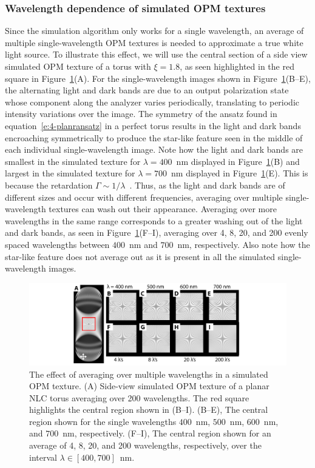 \subsubsection{Wavelength dependence of simulated OPM textures}
Since the simulation algorithm only works for a single wavelength, an average of multiple single-wavelength OPM textures is needed to approximate a true white light source.
To illustrate this effect, we will use the central section of a side view simulated OPM texture of a torus with $\xi = 1.8$, as seen highlighted in the red square in Figure~\ref{fig_lambda}(A).
For the single-wavelength images shown in Figure~\ref{fig_lambda}(B--E), the alternating light and dark bands are due to an output polarization state whose component along the analyzer varies periodically, translating to periodic intensity variations over the image.
The symmetry of the ansatz found in equation~\ref{e:4-planransatz} in a perfect torus results in the light and dark bands encroaching symmetrically to produce the star-like feature seen in the middle of each individual single-wavelength image.
Note how the light and dark bands are smallest in the simulated texture for $\lambda = 400 $~nm displayed in Figure~\ref{fig_lambda}(B) and largest in the simulated texture for $\lambda = 700$~nm displayed in Figure~\ref{fig_lambda}(E).
This is because the retardation $\Gamma \sim 1/\lambda$~\cite{RN232}.
Thus, as the light and dark bands are of different sizes and occur with different frequencies, averaging over multiple single-wavelength textures can wash out their appearance.
Averaging over more wavelengths in the same range corresponds to a greater washing out of the light and dark bands, as seen in Figure~\ref{fig_lambda}(F--I), averaging over 4, 8, 20, and 200 evenly spaced wavelengths between $400$~nm and $700$~nm, respectively.
Also note how the star-like feature does not average out as it is present in all the simulated single-wavelength images.
\begin{figure}
\centering
\includegraphics{figures/C4/Ch4-Figs_SimWavelengthAverage.png}
\caption{The effect of averaging over multiple wavelengths in a simulated OPM texture.
(A) Side-view simulated OPM texture of a planar NLC torus averaging over 200 wavelengths.
The red square highlights the central region shown in (B--I).
(B--E), The central region shown for the single wavelengths $400$~nm, $500$~nm, $600$~nm, and $700$~nm, respectively.
(F--I), The central region shown for an average of 4, 8, 20, and 200 wavelengths, respectively, over the interval $\lambda \in [400,700]$~nm.}\label{fig_lambda}
\end{figure}


